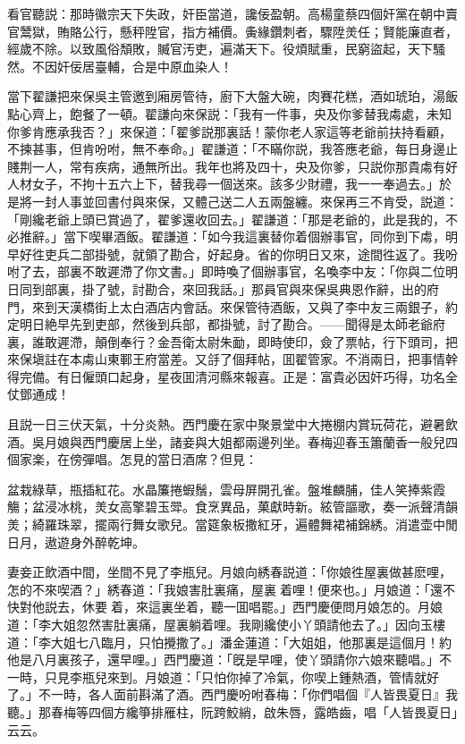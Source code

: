 看官聽説：那時徽宗天下失政，奸臣當道，讒佞盈朝。高楊童蔡四個奸黨在朝中賣官鬵獄，賄賂公行，懸秤陞官，指方補價。夤緣鑽刺者，驟陞羙任；賢能廉直者，經歲不除。以致風俗頽敗，贓官汚吏，遍滿天下。役煩賦重，民窮盜起，天下騷然。不因奸佞居臺輔，合是中原血染人！

當下翟謙把來保吳主管邀到廂房管待，廚下大盤大碗，肉賽花糕，酒如琥珀，湯飯點心齊上，飽餐了一頓。翟謙向來保説：「我有一件事，央及你爹替我䖏處，未知你爹肯應承我否？」來保道：「翟爹説那裏話！蒙你老人家這等老爺前扶持看顧，不揀甚事，但肯吩咐，無不奉命。」翟謙道：「不瞞你説，我答應老爺，每日身邊止賤荆一人，常有疾病，通無所出。我年也將及四十，央及你爹，只説你那貴䖏有好人材女子，不拘十五六上下，替我尋一個送來。該多少財禮，我一一奉過去。」於是將一封人事並回書付與來保，又體己送二人五兩盤纏。來保再三不肯受，説道：「剛纔老爺上頭已賞過了，翟爹還收回去。」翟謙道：「那是老爺的，此是我的，不必推辭。」當下喫畢酒飯。翟謙道：「如今我這裏替你着個辦事官，同你到下䖏，明早好徃吏兵二部掛號，就領了勘合，好起身。省的你明日又來，途間徃返了。我吩咐了去，部裏不敢遲滯了你文書。」即時喚了個辦事官，名喚李中友：「你與二位明日同到部裏，掛了號，討勘合，來回我話。」那員官與來保吳典恩作辭，出的府門，來到天漢橋街上太白酒店内會話。來保管待酒飯，又與了李中友三兩銀子，約定明日絶早先到吏部，然後到兵部，都掛號，討了勘合。——聞得是太師老爺府裏，誰敢遲滯，顛倒奉行？金吾衛太尉朱勔，即時使印，僉了票帖，行下頭司，把來保塡註在本䖏山東鄆王府當差。又㧱了個拜帖，囬翟管家。不消兩日，把事情幹得完備。有日僱頭口起身，星夜囬清河縣來報喜。正是：富貴必因奸巧得，功名全仗鄧通成！

且説一日三伏天氣，十分炎熱。西門慶在家中聚景堂中大捲棚内賞玩荷花，避暑飲酒。吳月娘與西門慶居上坐，諸妾與大姐都兩邊列坐。春梅迎春玉簫蘭香一般兒四個家楽，在傍彈唱。怎見的當日酒席？但見：

\begin{myquote}
盆栽綠草，瓶插紅花。水晶簾捲蝦鬚，雲母屏開孔雀。盤堆麟脯，佳人笑捧紫霞觴；盆浸冰桃，羙女高擎碧玉斝。食烹異品，菓獻時新。絃管謳歌，奏一派聲清韻羙；綺羅珠翠，擺兩行舞女歌兒。當筵象板撒紅牙，遍體舞裙補錦綉。消遣壶中閒日月，遨遊身外醉乾坤。
\end{myquote}

妻妾正飲酒中間，坐間不見了李瓶兒。月娘向綉春説道：「你娘徃屋裏做甚麽哩，怎的不來喫酒？」綉春道：「我娘害肚裏痛，屋裏𢱉着哩！便來也。」月娘道：「還不快對他説去，休要𢱉着，來這裏坐着，聽一囬唱罷。」西門慶便問月娘怎的。月娘道：「李大姐忽然害肚裏痛，屋裏躺着哩。我剛纔使小丫頭請他去了。」因向玉樓道：「李大姐七八臨月，只怕攪撒了。」潘金蓮道：「大姐姐，他那裏是這個月！約他是八月裏孩子，還早哩。」西門慶道：「旣是早哩，使丫頭請你六娘來聽唱。」不一時，只見李瓶兒來到。月娘道：「只怕你掉了冷氣，你喫上鍾熱酒，管情就好了。」不一時，各人面前斟滿了酒。西門慶吩咐春梅：「你們唱個『人皆畏夏日』我聽。」那春梅等四個方纔箏排雁柱，阮跨鮫綃，啟朱唇，露皓齒，唱「人皆畏夏日」云云。

